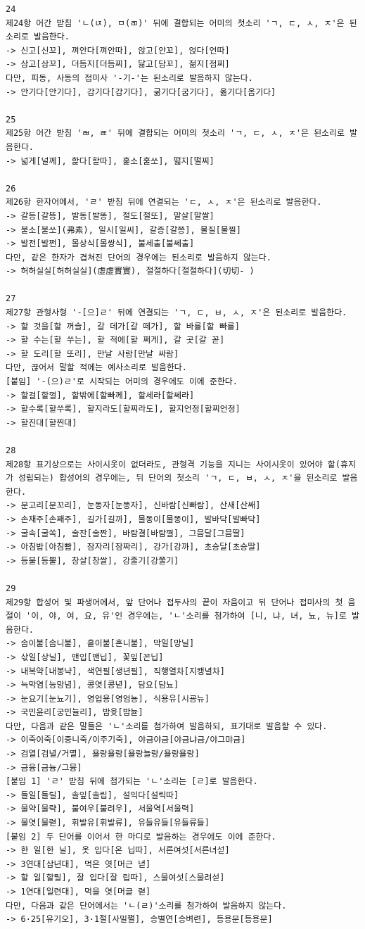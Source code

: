 \documentclass[letterpaper]{article} %
\begin{document}
\begin{verbatim}
24
제24항 어간 받침 'ㄴ(ㄵ), ㅁ(ㄻ)' 뒤에 결합되는 어미의 첫소리 'ㄱ, ㄷ, ㅅ, ㅈ'은 된소리로 발음한다.
-> 신고[신꼬], 껴안다[껴안따], 앉고[안꼬], 얹다[언따]
-> 삼고[삼꼬], 더듬지[더듬찌], 닮고[담꼬], 젊지[점찌]
다만, 피동, 사동의 접미사 '-기-'는 된소리로 발음하지 않는다.
-> 안기다[안기다], 감기다[감기다], 굶기다[굼기다], 옮기다[옴기다]

25
제25항 어간 받침 'ㄼ, ㄾ' 뒤에 결합되는 어미의 첫소리 'ㄱ, ㄷ, ㅅ, ㅈ'은 된소리로 발음한다.
-> 넓게[널께], 핥다[할따], 훑소[훌쏘], 떫지[떨찌]

26
제26항 한자어에서, 'ㄹ' 받침 뒤에 연결되는 'ㄷ, ㅅ, ㅈ'은 된소리로 발음한다.
-> 갈등[갈뜽], 발동[발똥], 절도[절또], 말살[말쌀]
-> 불소[불쏘](弗素), 일시[일씨], 갈증[갈쯩], 물질[물찔]
-> 발전[발쩐], 몰상식[몰쌍식], 불세출[불쎄출]
다만, 같은 한자가 겹쳐진 단어의 경우에는 된소리로 발음하지 않는다.
-> 허허실실[허허실실](虛虛實實), 절절하다[절절하다](切切- )

27
제27항 관형사형 '-[으]ㄹ' 뒤에 연결되는 'ㄱ, ㄷ, ㅂ, ㅅ, ㅈ'은 된소리로 발음한다.
-> 할 것을[할 꺼슬], 갈 데가[갈 떼가], 할 바를[할 빠를]
-> 할 수는[할 쑤는], 할 적에[할 쩌게], 갈 곳[갈 꼳]
-> 할 도리[할 또리], 만날 사람[만날 싸람]
다만, 끊어서 말할 적에는 예사소리로 발음한다.
[붙임] '-(으)ㄹ'로 시작되는 어미의 경우에도 이에 준한다.
-> 할걸[할껄], 할밖에[할빠께], 할세라[할쎄라]
-> 할수록[할쑤록], 할지라도[할찌라도], 할지언정[할찌언정]
-> 할진대[할찐대]

28
제28항 표기상으로는 사이시옷이 없더라도, 관형격 기능을 지니는 사이시옷이 있어야 할(휴지가 성립되는) 합성어의 경우에는, 뒤 단어의 첫소리 'ㄱ, ㄷ, ㅂ, ㅅ, ㅈ'을 된소리로 발음한다.
-> 문고리[문꼬리], 눈동자[눈똥자], 신바람[신빠람], 산새[산쌔]
-> 손재주[손째주], 길가[길까], 물동이[물똥이], 발바닥[발빠닥]
-> 굴속[굴쏙], 술잔[술짠], 바람결[바람껼], 그믐달[그믐딸]
-> 아침밥[아침빱], 잠자리[잠짜리], 강가[강까], 초승달[초승딸]
-> 등불[등뿔], 창살[창쌀], 강줄기[강쭐기]

29
제29항 합성어 및 파생어에서, 앞 단어나 접두사의 끝이 자음이고 뒤 단어나 접미사의 첫 음절이 '이, 야, 여, 요, 유'인 경우에는, 'ㄴ'소리를 첨가하여 [니, 냐, 녀, 뇨, 뉴]로 발음한다.
-> 솜이불[솜니불], 홑이불[혼니불], 막일[망닐]
-> 삯일[상닐], 맨입[맨닙], 꽃잎[꼰닙]
-> 내복약[내봉냑], 색연필[생년필], 직행열차[지캥녈차]
-> 늑막염[능망념], 콩엿[콩녇], 담요[담뇨]
-> 눈요기[눈뇨기], 영업용[영엄뇽], 식용유[시굥뉴]
-> 국민윤리[궁민뉼리], 밤윳[밤뉻]
다만, 다음과 같은 말들은 'ㄴ'소리를 첨가하여 발음하되, 표기대로 발음할 수 있다.
-> 이죽이죽[이중니죽/이주기죽], 야금야금[야금냐금/야그먀금]
-> 검열[검녈/거멸], 욜랑욜랑[욜랑뇰랑/욜랑욜랑]
-> 금융[금늉/그뮹]
[붙임 1] 'ㄹ' 받침 뒤에 첨가되는 'ㄴ'소리는 [ㄹ]로 발음한다.
-> 들일[들릴], 솔잎[솔립], 설익다[설릭따]
-> 물약[물략], 불여우[불려우], 서울역[서울력]
-> 물엿[물렫], 휘발유[휘발류], 유들유들[유들류들]
[붙임 2] 두 단어를 이어서 한 마디로 발음하는 경우에도 이에 준한다.
-> 한 일[한 닐], 옷 입다[온 닙따], 서른여섯[서른녀섣]
-> 3연대[삼년대], 먹은 엿[머근 녇]
-> 할 일[할릴], 잘 입다[잘 립따], 스물여섯[스물려섣]
-> 1연대[일련대], 먹을 엿[머글 렫]
다만, 다음과 같은 단어에서는 'ㄴ(ㄹ)'소리를 첨가하여 발음하지 않는다.
-> 6·25[유기오], 3·1절[사밀쩔], 송별연[송벼련], 등용문[등용문]


\end{verbatim}
\end{document}
